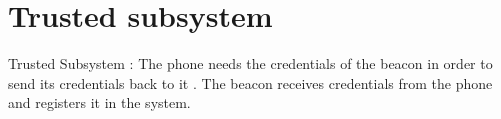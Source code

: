 

\section{Trusted subsystem}

Trusted Subsystem : The phone needs the credentials of the beacon in order to send its credentials back to it . The beacon receives credentials from the phone and registers it in the system. 
	